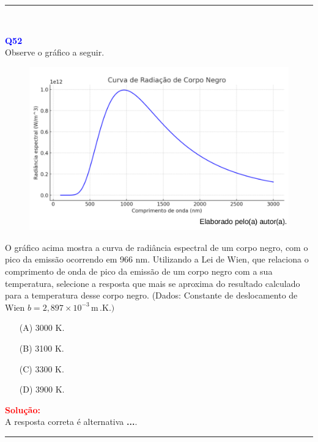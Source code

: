 \documentclass[a4paper,12pt]{article}
\begin{document}
\noindent\rule{\linewidth}{0.6pt}\\

\begin{flushleft}
\textbf{\textcolor{blue}{\Large Q52}}\\
\noindent
Observe o gráfico a seguir.

\begin{figure}[h]
\centering
\includegraphics[scale=0.5]{figures/radiacaocorponegro.png}
\end{figure}

O gráfico acima mostra a curva de radiância espectral de um
corpo negro, com o pico da emissão ocorrendo em 966 nm.
Utilizando a Lei de Wien, que relaciona o comprimento de
onda de pico da emissão de um corpo negro com a sua
temperatura, selecione a resposta que mais se aproxima do
resultado calculado para a temperatura desse corpo negro.
(Dados: Constante de deslocamento de Wien $b = 2,897 \times 10^{-3}\,\mathrm{m}\,.\mathrm{K}.)$

\begin{itemize}
\item[(A)] 3000 K.
\item[(B)] 3100 K.
\item[(C)] 3300 K.
\item[(D)] 3900 K.
\end{itemize}

\vspace{0.5cm}

\textcolor{red}{\textbf{Solução:}}\\

A resposta correta é alternativa \colorbox{green!50}{\textbf{...}}.
\end{flushleft}

\noindent\rule{\linewidth}{0.6pt}\\
\end{document}
